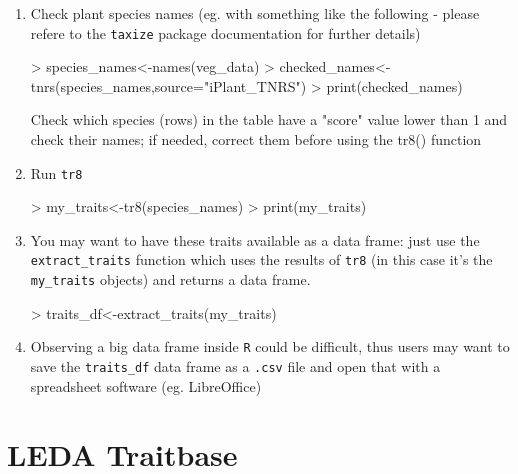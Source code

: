 \documentclass{article}
\begin{document}
  \begin{enumerate}
  \item Check plant species names (eg. with something like the following -  please refere to the \texttt{taxize} package documentation\cite{taxize} for further details)
    
\begin{Schunk}
\begin{Sinput}
> species_names<-names(veg_data)
> checked_names<-tnrs(species_names,source="iPlant_TNRS")
> print(checked_names)
\end{Sinput}
\end{Schunk}

 Check which species (rows) in the table have a "score" value
 lower than 1 and check their names; if needed, correct them
 before using the tr8() function
\item Run \texttt{tr8}

\begin{Schunk}
\begin{Sinput}
> my_traits<-tr8(species_names)
> print(my_traits)
\end{Sinput}
\end{Schunk}
 
\item You may want to have these traits available as a data frame:
  just use the \texttt{extract\_traits} function which uses the results
  of \texttt{tr8} (in this case it's the \texttt{my\_traits} objects)
  and returns a data frame.

\begin{Schunk}
\begin{Sinput}
> traits_df<-extract_traits(my_traits)
\end{Sinput}
\end{Schunk}

\item Observing a big data frame inside \texttt{R} could be difficult,
  thus users may want to save the \texttt{traits\_df} data frame as a
  \texttt{.csv} file and open that with a spreadsheet software (eg. LibreOffice)
 
  \end{enumerate}
  

  



\section{LEDA Traitbase}
\label{sec:leda}
\end{document}
